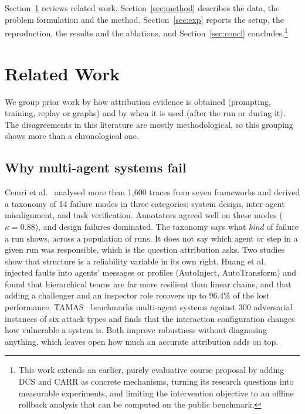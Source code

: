 \documentclass[conference]{IEEEtran}
\begin{document}
Section~\ref{sec:related} reviews related work. Section~\ref{sec:method} describes the data, the problem formulation and the method. Section~\ref{sec:exp} reports the setup, the reproduction, the results and the ablations, and Section~\ref{sec:concl} concludes.\footnote{This work extends an earlier, purely evaluative course proposal by adding DCS and CARR as concrete mechanisms, turning its research questions into measurable experiments, and limiting the intervention objective to an offline rollback analysis that can be computed on the public benchmark.}

\section{Related Work}\label{sec:related}
We group prior work by how attribution evidence is obtained (prompting, training, replay or graphs) and by when it is used (after the run or during it). The disagreements in this literature are mostly methodological, so this grouping shows more than a chronological one.

\subsection{Why multi-agent systems fail}
Cemri et al.~\cite{cemri2025why} analysed more than 1,600 traces from seven frameworks and derived a taxonomy of 14 failure modes in three categories: system design, inter-agent misalignment, and task verification. Annotators agreed well on these modes ($\kappa=0.88$), and design failures dominated. The taxonomy says what \emph{kind} of failure a run shows, across a population of runs. It does not say which agent or step in a given run was responsible, which is the question attribution asks. Two studies show that structure is a reliability variable in its own right. Huang et al.~\cite{huang2025resilience} injected faults into agents' messages or profiles (AutoInject, AutoTransform) and found that hierarchical teams are far more resilient than linear chains, and that adding a challenger and an inspector role recovers up to 96.4\% of the lost performance. TAMAS~\cite{kavathekar2026tamas} benchmarks multi-agent systems against 300 adversarial instances of six attack types and finds that the interaction configuration changes how vulnerable a system is. Both improve robustness without diagnosing anything, which leaves open how much an accurate attribution adds on top.
\end{document}
